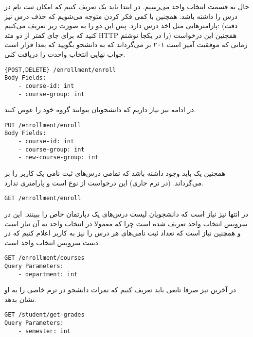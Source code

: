 حال به قسمت انتخاب واحد می‌رسیم. در ابتدا باید یک
تعریف کنیم که امکان ثبت نام در درس را داشته باشد. همچنین با کمی فکر کردن متوجه می‌شویم که حذف
درس نیز پارامتر‌هایی مثل اخذ درس دارد. پس این دو را به صورت زیر تعریف می‌کنیم:
(دقت کنید که برای جای کمتر از دو متد HTTP را در یکجا نوشتم)
همچنین این درخواست زمانی که موفقیت آمیز است ۲۰۱ بر می‌گرداند که به دانشجو بگویید که بعدا قرار است جواب
نهایی انتخاب واحدت را دریافت کنی.
\begin{latin}
\begin{lstlisting}
{POST,DELETE} /enrollment/enroll
Body Fields:
    - course-id: int
    - course-group: int
\end{lstlisting}
\end{latin}
در ادامه نیز نیاز داریم که دانشجویان بتوانند گروه خود را عوض کنند.
\begin{latin}
\begin{lstlisting}
PUT /enrollment/enroll
Body Fields:
    - course-id: int
    - course-group: int
    - new-course-group: int
\end{lstlisting}
\end{latin}
همچنین یک
باید وجود داشته باشد که تمامی درس‌های ثبت نامی یک کاربر را بر می‌گرداند.
(در ترم جاری)
این درخواست از نوع
است و پارامتری ندارد.
\begin{latin}
\begin{lstlisting}
GET /enrollment/enroll
\end{lstlisting}
\end{latin}
در انتها نیز نیاز است که دانشجویان لیست درس‌های یک دپارتمان خاص را ببینند. این
در سرویس انتخاب واحد تعریف شده است چرا که معمولا در انتخاب واحد به آن نیاز است و همچنین نیاز است
که تعداد ثبت نامی‌های هر درس را نیز به کاربر اعلام کنیم که در دست سرویس انتخاب واحد است.
\begin{latin}
\begin{lstlisting}
GET /enrollment/courses
Query Parameters:
    - department: int
\end{lstlisting}
\end{latin}
در آخرین
نیز صرفا تابعی باید تعریف کنیم که نمرات دانشجو در ترم خاصی را به او نشان بدهد.
\begin{latin}
\begin{lstlisting}
GET /student/get-grades
Query Parameters:
    - semester: int
\end{lstlisting}
\end{latin}
